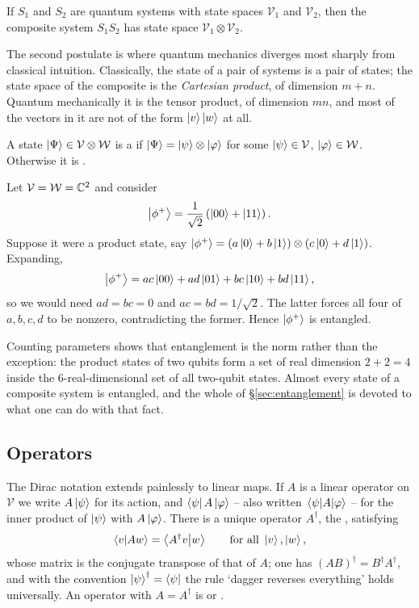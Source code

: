 \documentclass[a4paper]{scrartcl}
\newcommand{\Vs}{\mathcal{V}}
\newcommand{\Ws}{\mathcal{W}}
\begin{document}
\begin{axiom}
	If $S_1$ and $S_2$ are quantum systems with state spaces $\Vs_1$ and $\Vs_2$, then the composite system $S_1S_2$ has state space $\Vs_1 \otimes \Vs_2$.
\end{axiom}

The second postulate is where quantum mechanics diverges most sharply from classical intuition. Classically, the state of a pair of systems is a pair of states; the state space of the composite is the \emph{Cartesian product}, of dimension $m + n$. Quantum mechanically it is the tensor product, of dimension $mn$, and most of the vectors in it are not of the form $\ket{v}\ket{w}$ at all.

\begin{definition}
	A state $\ket{\Psi} \in \Vs \otimes \Ws$ is a  if $\ket{\Psi} = \ket{\psi}\otimes\ket{\varphi}$ for some $\ket{\psi} \in \Vs$, $\ket{\varphi} \in \Ws$. Otherwise it is .
\end{definition}

\begin{example}
	Let $\Vs = \Ws = \C^2$ and consider
	$$\ket{\phi^+} = \frac{1}{\sqrt2}\left(\ket{00} + \ket{11}\right).$$
	Suppose it were a product state, say $\ket{\phi^+} = (a\ket{0}+b\ket{1})\otimes(c\ket{0}+d\ket{1})$. Expanding,
	$$\ket{\phi^+} = ac\ket{00} + ad\ket{01} + bc\ket{10} + bd\ket{11},$$
	so we would need $ad = bc = 0$ and $ac = bd = 1/\sqrt2$. The latter forces all four of $a,b,c,d$ to be nonzero, contradicting the former. Hence $\ket{\phi^+}$ is entangled.
\end{example}

Counting parameters shows that entanglement is the norm rather than the exception: the product states of two qubits form a set of real dimension $2 + 2 = 4$ inside the $6$-real-dimensional set of all two-qubit states. Almost every state of a composite system is entangled, and the whole of \S\ref{sec:entanglement} is devoted to what one can do with that fact.

\subsection{Operators}

The Dirac notation extends painlessly to linear maps. If $A$ is a linear operator on $\Vs$ we write $A\ket{\psi}$ for its action, and $\bra{\psi}A\ket{\varphi}$ -- also written $\mel{\psi}{A}{\varphi}$ -- for the inner product of $\ket{\psi}$ with $A\ket{\varphi}$. There is a unique operator $A^\dagger$, the , satisfying
$$\ip{v}{Aw} = \ip{A^\dagger v}{w} \qquad \text{for all } \ket{v},\ket{w},$$
whose matrix is the conjugate transpose of that of $A$; one has $(AB)^\dagger = B^\dagger A^\dagger$, and with the convention $\ket{\psi}^\dagger = \bra{\psi}$ the rule `dagger reverses everything' holds universally. An operator with $A = A^\dagger$ is  or .
\end{document}
